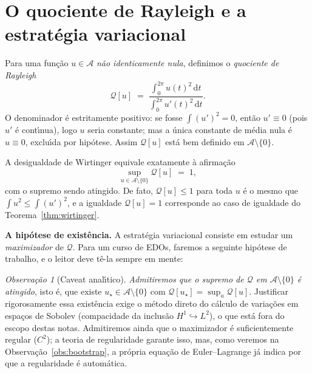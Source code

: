 \documentclass[11pt,a4paper]{amsart}
\renewcommand{\d}{\mathrm{d}}
\newcommand{\Q}{\mathcal{Q}}
\newcommand{\Adm}{\mathcal{A}}
\theoremstyle{plain}
\theoremstyle{definition}
\theoremstyle{remark}
\newtheorem{observacao}[teorema]{Observação}
\begin{document}
\section{O quociente de Rayleigh e a estrat\'egia variacional}
\label{sec:rayleigh}

Para uma fun\c{c}\~ao $u\in\Adm$ \emph{n\~ao identicamente nula}, definimos o
\emph{quociente de Rayleigh}
\begin{equation}\label{eq:rayleigh}
  \Q[u] \;=\; \frac{\displaystyle\int_0^{2\pi} u(t)^2\,\d t}
                   {\displaystyle\int_0^{2\pi} u'(t)^2\,\d t}.
\end{equation}
O denominador \'e estritamente positivo: se fosse $\int (u')^2=0$, ent\~ao
$u'\equiv 0$ (pois $u'$ \'e cont\'\i nua), logo $u$ seria constante; mas a
\'unica constante de m\'edia nula \'e $u\equiv 0$, exclu\'\i da por
hip\'otese. Assim $\Q[u]$ est\'a bem definido em $\Adm\setminus\{0\}$.

A desigualdade de Wirtinger equivale exatamente \`a afirma\c{c}\~ao
\[
  \sup_{u\in\Adm\setminus\{0\}} \Q[u] \;=\; 1 ,
\]
com o supremo sendo atingido. De fato, $\Q[u]\le 1$ para toda $u$ \'e o mesmo
que $\int u^2\le \int (u')^2$, e a igualdade $\Q[u]=1$ corresponde ao caso de
igualdade do Teorema~\ref{thm:wirtinger}.

\medskip

\noindent\textbf{A hip\'otese de exist\^encia.}\quad
A estrat\'egia variacional consiste em estudar um \emph{maximizador} de $\Q$.
Para um curso de EDOs, faremos a seguinte hip\'otese de trabalho, e o leitor
deve t\^e-la sempre em mente:

\begin{observacao}[Caveat anal\'\i tico]\label{obs:existencia}
\emph{Admitiremos que o supremo de $\Q$ em $\Adm\setminus\{0\}$ \'e atingido},
isto \'e, que existe $u_\star\in\Adm\setminus\{0\}$ com
$\Q[u_\star]=\sup_u\Q[u]$. Justificar rigorosamente essa exist\^encia exige o
m\'etodo direto do c\'alculo de varia\c{c}\~oes em espa\c{c}os de Sobolev
(compacidade da inclus\~ao $H^1\hookrightarrow L^2$), o que est\'a fora do
escopo destas notas. Admitiremos ainda que o maximizador \'e suficientemente
regular ($C^2$); a teoria de regularidade garante isso, mas, como veremos na
Observa\c{c}\~ao~\ref{obs:bootstrap}, a pr\'opria equa\c{c}\~ao de
Euler--Lagrange j\'a indica por que a regularidade \'e autom\'atica.
\end{observacao}
\end{document}

